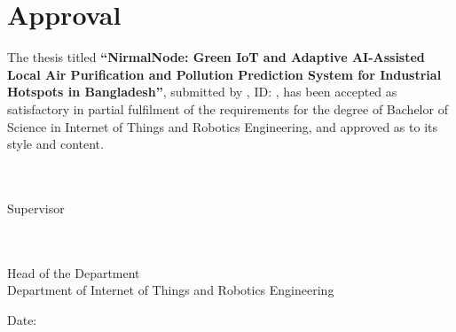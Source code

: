 \chapter*{Approval}

The thesis titled \textbf{``NirmalNode: Green IoT and Adaptive AI-Assisted Local Air Purification and Pollution Prediction System for Industrial Hotspots in Bangladesh''}, submitted by , ID: , has been accepted as satisfactory in partial fulfilment of the requirements for the degree of Bachelor of Science in Internet of Things and Robotics Engineering, and approved as to its style and content.

\vspace{2.5cm}

\noindent
\begin{minipage}{0.45\textwidth}
\\[0.6cm]
\\
Supervisor\\
\end{minipage}%
\begin{minipage}{0.45\textwidth}
\\[0.6cm]
\\
Head of the Department\\
Department of Internet of Things and Robotics Engineering
\end{minipage}

\vspace{2cm}
\noindent Date: 
